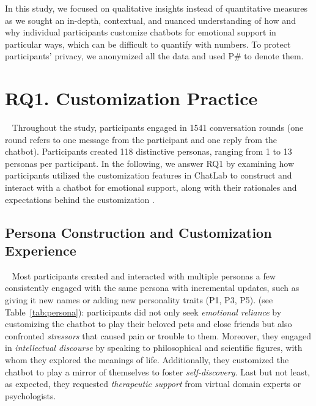 In this study, we focused on qualitative insights instead of quantitative measures as we sought an in-depth, contextual, and nuanced understanding of how and why individual participants customize chatbots for emotional support in particular ways, which can be difficult to quantify with numbers. To protect participants' privacy, we anonymized all the data and used P\# to denote them.


\vspace{-1mm}
\section{\textbf{RQ1}. Customization Practice}~\label{RQ1}
Throughout the study, participants engaged in 1541 conversation rounds (one round refers to one message from the participant and one reply from the chatbot). 
Participants created 118 distinctive personas, ranging from 1 to 13 personas per participant. 
In the following, we answer RQ1 by examining how participants utilized the customization features in ChatLab to construct and interact with a chatbot for emotional support, along with their rationales and expectations behind the customization . 

\vspace{-1mm}
\subsection{Persona Construction and Customization Experience}~\label{customization-experience}
Most participants created and interacted with multiple personas  a few consistently engaged with the same persona with incremental updates, such as giving it new names or adding new personality traits (P1, P3, P5). 
 (see Table~\ref{tab:persona}): participants did not only seek \textit{emotional reliance} by customizing the chatbot to play their beloved pets and close friends but also confronted \textit{stressors} that caused pain or trouble to them. Moreover, they engaged in \textit{intellectual discourse} by speaking to philosophical and scientific figures, with whom they explored the meanings of life. Additionally, they customized the chatbot to play a mirror of themselves to foster \textit{self-discovery}. Last but not least, as expected, they requested \textit{therapeutic support} from virtual domain experts or psychologists.  




